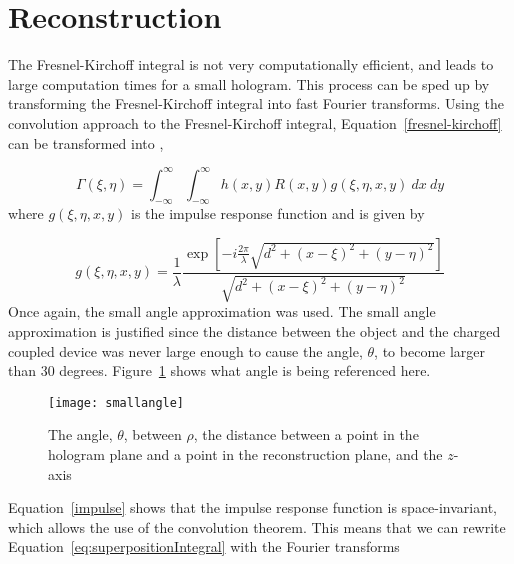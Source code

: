 

    \section{Reconstruction}

    The Fresnel-Kirchoff integral is not very computationally efficient, and
    leads to large computation times for a small hologram. This process can be
    sped up by transforming the Fresnel-Kirchoff integral into fast Fourier
    transforms.
    Using the convolution approach to the Fresnel-Kirchoff integral,
    Equation~\ref{fresnel-kirchoff} can be transformed into
    \cite{schnars_digital_2002},

    \begin{equation}
        \Gamma(\xi,\eta) = \int_{-\infty}^{\infty}\int_{-\infty}^{\infty}
        h(x,y)R(x,y) g(\xi,\eta,x,y)~dx~dy
        \label{eq:superpositionIntegral}
    \end{equation}
    where $g(\xi,\eta,x,y)$ is the impulse response function and is given by

    \begin{equation}
        g(\xi,\eta,x,y)=\frac{1}{\lambda}\frac{\exp\left[
        -i\frac{2\pi}{\lambda}\sqrt{d^{2}+(x-\xi)^{2}+(y-\eta)^{2}} \right]}{\sqrt{d^{2}+(x-\xi)^{2}+(y-\eta)^{2}}}
        \label{impulse}
    \end{equation}
    Once again, the small angle approximation was used. The small angle
    approximation is justified since the distance between the object and the
    charged coupled device was never large enough to cause the angle,
    $\theta$, to become larger than 30 degrees. Figure~\ref{fig:smallangle}
    shows what angle is being referenced here.
    \begin{figure}
    \begin{center}
        \texttt{[image: smallangle]}
    \end{center}
    \caption{The angle, $\theta$, between $\rho$, the distance between a point
    in the hologram plane and a point in the reconstruction plane, and the
$z$-axis}
    \label{fig:smallangle}
    \end{figure}

    Equation~\ref{impulse}
    shows that the impulse response function is space-invariant, which allows the
    use of the convolution theorem. This means that we can rewrite
    Equation~\ref{eq:superpositionIntegral} with the Fourier transforms

